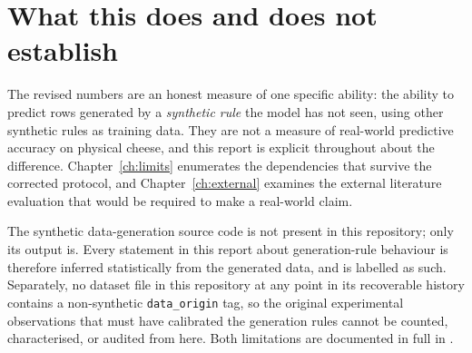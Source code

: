 \section*{What this does and does not establish}

The revised numbers are an honest measure of one specific ability: the
ability to predict rows generated by a \emph{synthetic rule} the model has
not seen, using other synthetic rules as training data. They are not a
measure of real-world predictive accuracy on physical cheese, and this
report is explicit throughout about the difference. Chapter~\ref{ch:limits}
enumerates the dependencies that survive the corrected protocol, and
Chapter~\ref{ch:external} examines the external literature evaluation
that would be required to make a real-world claim.

\begin{limitbox}[title=Principal evidence limitation]
The synthetic data-generation source code is not present in this
repository; only its output is. Every statement in this report about
generation-rule behaviour is therefore inferred statistically from the
generated data, and is labelled as such. Separately, no dataset file in
this repository at any point in its recoverable history contains a
non-synthetic \texttt{data\_origin} tag, so the original experimental
observations that must have calibrated the generation rules cannot be
counted, characterised, or audited from here. Both limitations are
documented in full in .
\end{limitbox}
